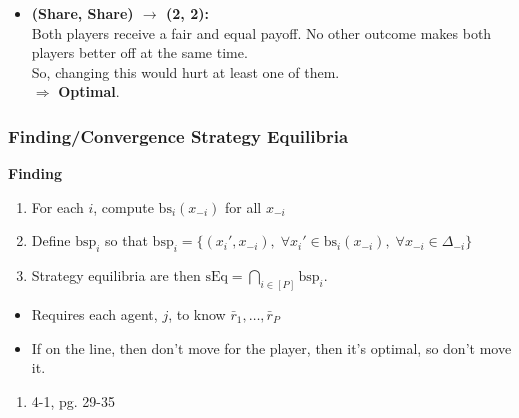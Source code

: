 \begin{example}
\begin{enumerate}
\begin{enumerate}
\begin{itemize}
                \item \textbf{(Share, Share) $\rightarrow$ (2, 2):} \\
                Both players receive a fair and equal payoff. No other outcome makes both players better off at the same time. \\
                So, changing this would hurt at least one of them. \\
                $\Rightarrow$ \textbf{Optimal}.
            \end{itemize}                                 
        \end{enumerate}
    \end{enumerate}
\end{example}
\newpage

\subsubsection{Finding/Convergence Strategy Equilibria}
\begin{process} \textbf{Finding}
    \begin{enumerate}
        \item For each $i$, compute $\text{bs}_i (x_{-i})$ for all $x_{-i}$
        \item Define $\text{bsp}_i$ so that $\text{bsp}_i = \{(x_i',x_{-i}), \; \forall x_i' \in \text{bs}_i (x_{-i}), \; \forall x_{-i} \in \Delta_{-i}\}$
        \item Strategy equilibria are then $\text{sEq} = \bigcap_{i\in [P]} \text{bsp}_i$.
    \end{enumerate}
    \begin{itemize}
        \item Requires each agent, $j$, to know $\bar{r}_1,\ldots,\bar{r}_P$
    \end{itemize}
\end{process}

\begin{warning}
    \begin{itemize}
        \item If on the line, then don't move for the player, then it's optimal, so don't move it. 
    \end{itemize}
\end{warning}
\newpage

\begin{example}
    \begin{enumerate}
        \item 4-1, pg. 29-35
    \end{enumerate}
\end{example}


